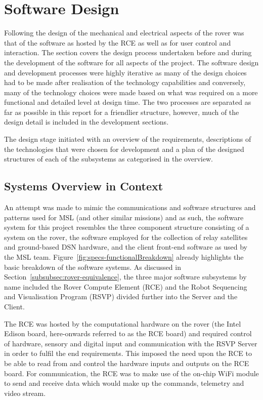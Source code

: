 \section{Software Design}
  Following the design of the mechanical and electrical aspects of the rover was that of the software as hosted by the RCE as well as for user control and interaction. The section covers the design process undertaken before and during the development of the software for all aspects of the project. The software design and development processes were highly iterative as many of the design choices had to be made after realisation of the technology capabilities and conversely, many of the technology choices were made based on what was required on a more functional and detailed level at design time. The two processes are separated as far as possible in this report for a friendlier structure, however, much of the design detail is included in the development sections.
  
  The design stage initiated with an overview of the requirements, descriptions of the technologies that were chosen for development and a plan of the designed structures of each of the subsystems as categorised in the overview.
  
  \subsection{Systems Overview in Context}
    An attempt was made to mimic the communications and software structures and patterns used for MSL (and other similar missions) and as such, the software system for this project resembles the three component structure consisting of a system on the rover, the software employed for the collection of relay satellites and ground-based DSN hardware, and the client front-end software as used by the MSL team. Figure~\ref{fig:specs-functionalBreakdown} already highlights the basic breakdown of the software systems. As discussed in Section~\ref{subsubsec:rover-equivalence}, the three major software subsystems by name included the Rover Compute Element (RCE) and the Robot Sequencing and Visualisation Program (RSVP) divided further into the Server and the Client.
    
    The RCE was hosted by the computational hardware on the rover (the Intel Edison board, here-onwards referred to as the RCE board) and required control of hardware, sensory and digital input and communication with the RSVP Server in order to fulfil the end requirements. This imposed the need upon the RCE to be able to read from and control the hardware inputs and outputs on the RCE board. For communication, the RCE was to make use of the on-chip WiFi module to send and receive data which would make up the commands, telemetry and video stream.
    

